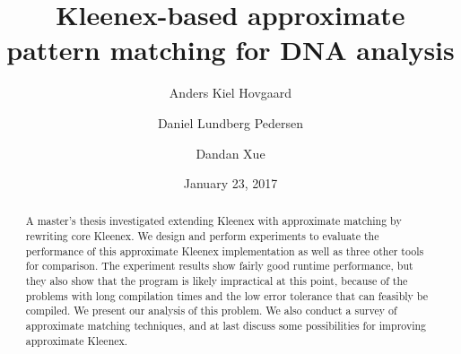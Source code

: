 \documentclass[a4paper,11pt]{article}
\title{Kleenex-based approximate pattern matching for DNA analysis}
\author{Anders Kiel Hovgaard \and Daniel Lundberg Pedersen \and Dandan Xue}
\date{January 23, 2017}
\theoremstyle{definition}
\begin{document}
\maketitle

\begin{abstract}
  A master's thesis investigated extending Kleenex with approximate matching by
  rewriting core Kleenex. We design and perform experiments to evaluate the
  performance of this approximate Kleenex implementation as well as three other
  tools for comparison. The experiment results show fairly good runtime
  performance, but they also show that the program is likely impractical at
  this point, because of the problems with long compilation times and the low
  error tolerance that can feasibly be compiled. We present our analysis of
  this problem. We also conduct a survey of approximate matching techniques,
  and at last discuss some possibilities for improving approximate Kleenex.
\end{abstract}
\newpage

\tableofcontents
\newpage








\clearpage



\clearpage
\appendix

\end{document}
